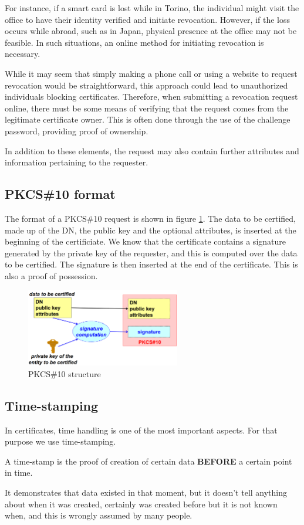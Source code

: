 For instance, if a smart card is lost while in Torino, the individual
might visit the office to have their identity verified and initiate
revocation. However, if the loss occurs while abroad, such as in Japan,
physical presence at the office may not be feasible. In such
situations, an online method for initiating revocation is necessary.

While it may seem that simply making a phone call or using a website to
request revocation would be straightforward, this approach could lead
to unauthorized individuals blocking certificates. Therefore, when
submitting a revocation request online, there must be some means of
verifying that the request comes from the legitimate certificate owner.
This is often done through the use of the challenge password, providing
proof of ownership.

In addition to these elements, the request may also contain further
attributes and information pertaining to the requester.

\subsection{PKCS\#10 format}
The format of a PKCS\#10 request is shown in figure 
\ref{fig:PKCS10 structure}. The data to be certified, made up of the
DN, the public key and the optional attributes, is inserted at the
beginning of the certificiate. We know that the certificate contains a
signature generated by the private key of the requester, and this is
computed over the data to be certified. The signature is then inserted
at the end of the certificate. This is also a proof of possession.

\begin{figure}[H]
  \centering
  \includegraphics[width=0.6\textwidth]{img/x509 pkcs request.png}

  \caption{PKCS\#10 structure}
  \label{fig:PKCS10 structure}
\end{figure}

\subsection{Time-stamping}
In certificates, time handling is one of the most important aspects.
For that purpose we use time-stamping.
\begin{boxH}
  A time-stamp is the proof of creation of certain data
  \textbf{BEFORE} a certain point in time.
\end{boxH}
It demonstrates that data existed in that moment, but it doesn’t tell
anything about when it was created, certainly was created before but
it is not known when, and this is wrongly assumed by many people.

